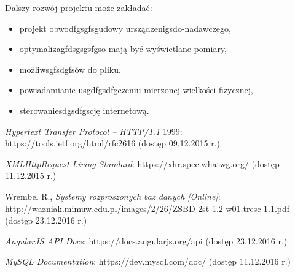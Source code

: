 \documentclass{mgr}
\begin{document}
Dalszy rozwój projektu może zakładać:
\begin{itemize}
\item projekt obwodfgsgfsgudowy ursządzenigsdo-nadawczego,
\item optymalizagfdsgsgsfgso mają być
wyświetlane pomiary,
\item możliwsgfsdgfsów do pliku.
\item powiadamianie usgdfgsdfgczeniu mierzonej wielkości
fizycznej,
\item sterowaniesdgsdfgscję internetową.
\end{itemize}
  \begin{thebibliography}{9}

   {\em Hypertext Transfer Protocol -- HTTP/1.1} 1999: 
  https://tools.ietf.org/html/rfc2616 (dostęp 09.12.2015 r.)

   {\em XMLHttpRequest Living Standard}: 
  https://xhr.spec.whatwg.org/ (dostęp 11.12.2015 r.)

   Wrembel R., {\em Systemy rozproszonych baz danych [Online]}:
  http://wazniak.mimuw.edu.pl/images/2/26/ZSBD-2st-1.2-w01.tresc-1.1.pdf
  (dostęp 23.12.2016 r.)

   {\em AngularJS API Docs}: https://docs.angularjs.org/api 
  (dostęp 23.12.2016 r.)

   {\em MySQL Documentation}: https://dev.mysql.com/doc/
  (dostęp 11.12.2016 r.)


  \end{thebibliography}

\listoffigures
{}
 \listoftables
{}
 \lstlistoflistings
\end{document}

